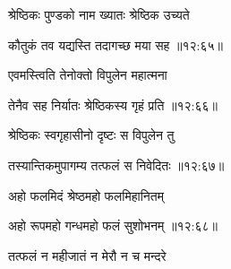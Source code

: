 {\devanagarifont श्रेष्ठिकः पुण्डको नाम ख्यातः श्रेष्ठिक उच्यते \thinspace{\dandab} \dontdisplaylinenum }%
 

{\devanagarifont कौतुकं तव यद्यस्ति तदागच्छ मया सह {॥१२:६५॥} \veg\dontdisplaylinenum }%
 
{\devanagarifont एवमस्त्विति तेनोक्तो विपुलेन महात्मना \thinspace{\dandab} \dontdisplaylinenum }%


{\devanagarifont तेनैव सह निर्यातः श्रेष्ठिकस्य गृहं प्रति {॥१२:६६॥} \veg\dontdisplaylinenum }%

{\devanagarifont श्रेष्ठिकः स्वगृहासीनो दृष्टः स विपुलेन तु \thinspace{\dandab} \dontdisplaylinenum }%


{\devanagarifont तस्यान्तिकमुपागम्य तत्फलं स निवेदितः {॥१२:६७॥} \veg\dontdisplaylinenum }%

{\devanagarifont अहो फलमिदं श्रेष्ठमहो फलमिहानितम् \thinspace{\dandab} \dontdisplaylinenum }%


{\devanagarifont अहो रूपमहो गन्धमहो फलं सुशोभनम् {॥१२:६८॥} \veg\dontdisplaylinenum }%

{\devanagarifont तत्फलं न महीजातं न मेरौ न च मन्दरे \thinspace{\dandab} \dontdisplaylinenum }%


